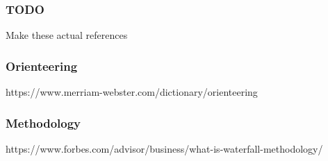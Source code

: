 \subsubsection*{TODO}
 Make these actual references
 
\subsubsection*{Orienteering}
https://www.merriam-webster.com/dictionary/orienteering

\subsubsection*{Methodology}
https://www.forbes.com/advisor/business/what-is-waterfall-methodology/